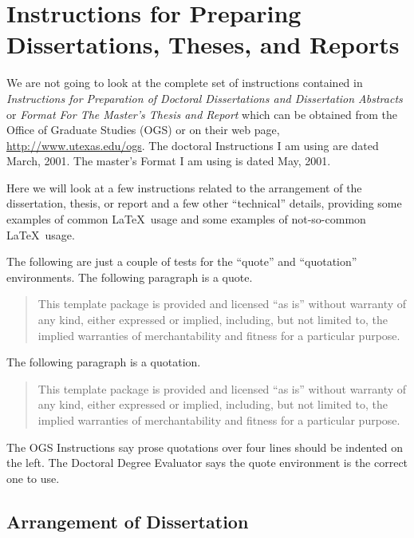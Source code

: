 \chapter{Instructions for Preparing Dissertations, Theses, and Reports}
%

We are not going to look at the complete set of instructions contained
in \emph{Instructions for Preparation of Doctoral Dissertations and
Dissertation Abstracts} or \emph{Format For The Master's Thesis and Report}
which can be obtained from the Office of Graduate Studies (OGS)
%
or on their web page,
%
\url{http://www.utexas.edu/ogs}.
The doctoral Instructions I am using are dated March, 2001.
The master's Format I am using is dated May, 2001.

Here we will look at a few instructions related to the arrangement of the
dissertation, thesis, or report and a few other ``technical'' details,
providing some examples of common \LaTeX\ usage and some examples of
not-so-common \LaTeX\ usage.

The following are just a couple of tests for the ``quote''
and ``quotation'' environments. The following paragraph is a quote.
\begin{quote}
%
This template package is provided and licensed
``as is'' without warranty of any kind, either expressed or
implied, including, but not limited to, the implied warranties
of merchantability and fitness for a particular purpose.
\end{quote}
The following paragraph is a quotation.
\begin{quotation}
%
This template package is provided and licensed
``as is'' without warranty of any kind, either expressed or
implied, including, but not limited to, the implied warranties
of merchantability and fitness for a particular purpose.
\end{quotation}

The OGS Instructions say prose quotations over four lines
should be indented on the left. The Doctoral Degree Evaluator says
the quote environment is the correct one to use.

\section{Arrangement of Dissertation}
%

